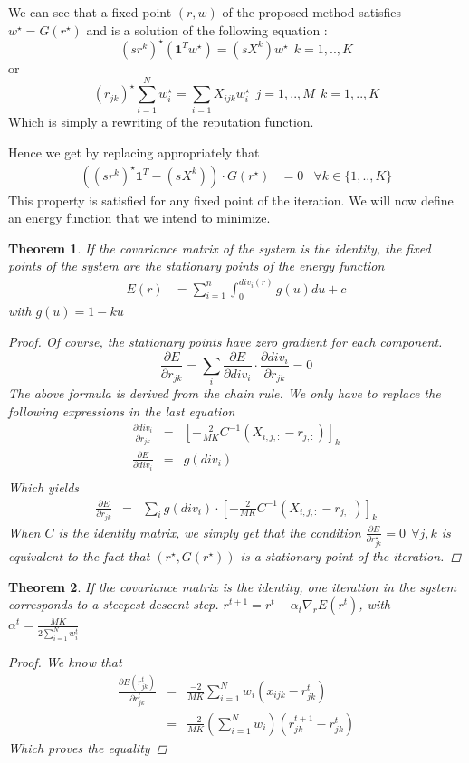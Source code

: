 \documentclass[12pt,a4paper]{article}
\newtheorem{theorem}{Theorem}
\begin{document}
We can see that a fixed point $(r,w)$ of the proposed method satisfies $ w^{\star} = G(r^{\star})$ and is a solution of the following equation :
$$ (sr^k)^{\star} (\mathbf{1}^Tw^{\star}) = (sX^k)w^{\star} \:\: k = 1,..,K$$
or 
$$ (r_{jk})^{\star} \sum_{i=1}^N w_i^{\star} = \sum_{i=1} X_{ijk} w_i^{\star} \:\: j = 1,..,M \:\: k = 1,..,K$$
Which is simply a rewriting of the reputation function.


Hence we get by replacing appropriately that
\begin{align*}
((sr^k)^{\star} \mathbf{1}^T - (sX^k))\cdot G(r^{\star}) &= 0 & \forall k\in \{1,..,K\}
\end{align*}
This property is satisfied for any fixed point of the iteration. We will now define an energy function that we intend to minimize.
\begin{theorem}
If the covariance matrix of the system is the identity, the fixed points of the system are the stationary points of the energy function
\begin{align}
E(r) &=  \sum_{i=1}^n \int_0^{div_i(r)}g(u) du + c \label{eq:energy}
\end{align}
with $g(u) = 1 -ku$
\begin{proof}
Of course, the stationary points have zero gradient for each component.
$$
\frac{\partial E}{\partial r_{jk}} =  \sum_{i}\frac{\partial E}{\partial div_i} \cdot \frac{\partial div_i}{\partial r_{jk}} = 0
$$
The above formula is derived from the chain rule. We only have to replace the following expressions in the last equation
\begin{eqnarray*}
\frac{\partial div_i}{\partial r_{jk}} & = & \left[-\frac{2}{MK} C^{-1}(X_{i,j,:}-r_{j,:})\right]_{k} \\
\frac{\partial E}{\partial div_i} & = & g(div_i)\\
\end{eqnarray*}
Which yields
\begin{eqnarray*}
\frac{\partial E}{\partial r_{jk}} & = & \sum_{i}g(div_i) \cdot \left[-\frac{2}{MK} C^{-1}(X_{i,j,:}-r_{j,:})\right]_{k} 
\end{eqnarray*}
When $C$ is the identity matrix, we simply get that the condition $\frac{\partial E}{\partial r^{\star}_{jk}}=0 \:\: \forall j,k$ is equivalent to the fact that $(r^{\star},G(r^{\star}))$ is a stationary point of the iteration.
\end{proof}
\end{theorem}
\begin{theorem}
If the covariance matrix is the identity, one iteration in the system corresponds to a steepest descent step.
$r^{t+1} = r^t - \alpha_t \nabla_r E(r^t)$, with $\alpha^t = \frac{MK}{2 \sum_{i=1}^N w^t_i}$
\begin{proof}
We know that 
\begin{eqnarray*}
\frac{\partial E(r^t_{jk})}{\partial r^t_{jk}} & = & \frac{-2}{MK} \sum_{i=1}^N w_i (x_{ijk}-r^t_{jk})\\
& = & \frac{-2}{MK} (\sum_{i=1}^N w_i)(r^{t+1}_{jk}- r^t_{jk})
\end{eqnarray*}
Which proves the equality
\end{proof}
\end{theorem}
\end{document}
